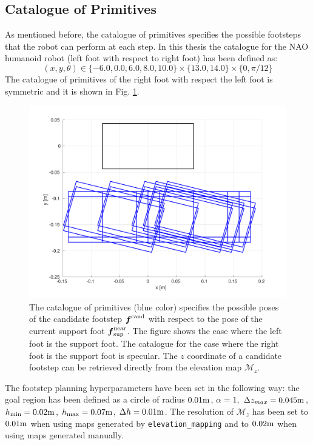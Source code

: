 \subsection{Catalogue of Primitives}
As mentioned before, the catalogue of primitives specifies the possible 
footsteps that the robot can perform at each step. In this thesis the catalogue 
for the NAO humanoid robot (left foot with respect to right foot)
has been defined as:
\begin{equation}
  (x, y, \theta) \in \{ -6.0, 0.0, 6.0, 8.0, 10.0 \} \times
      \{ 13.0, 14.0 \} \times \{ 0, \pi/12 \}
\end{equation}
The catalogue of primitives of the right foot with respect the left foot is 
symmetric and it is shown in Fig. \ref{fig:catalogue-primitives}.
\begin{figure}
    \centering
    \includegraphics[width=\textwidth]{figures/catalogue-primitives.pdf}
    \caption{The catalogue of primitives (blue color) specifies the possible
        poses of the
        candidate footstep ${\mbox{\boldmath $f$}}^{\rm cand}$ with respect to the pose of the 
        current support foot ${\mbox{\boldmath $f$}}_{\rm sup}^{\rm near}$. The figure shows the 
        case where the left foot is the support foot. The catalogue for the 
        case where the right foot is the support foot is specular. The $z$
        coordinate of a candidate footstep can be retrieved directly from 
        the elevation map $\mathcal{M}_z$.}
    \label{fig:catalogue-primitives}
\end{figure}
The footstep planning hyperparameters have been set in the following way:
the goal region has been defined as a circle of radius $0.01 {\rm m}$,
$\alpha=1$,
$\Delta z_{max}=0.045 {\rm m}$, $h_{\min}=0.02 {\rm m}$,
$h_{\max}=0.07 {\rm m}$, $\Delta h=0.01 {\rm m}$.
The resolution of $\mathcal{M}_z$ has been set to $0.01 {\rm m}$ when using maps 
generated by \texttt{elevation\_mapping} and to $0.02 {\rm m}$ when using maps 
generated manually.

